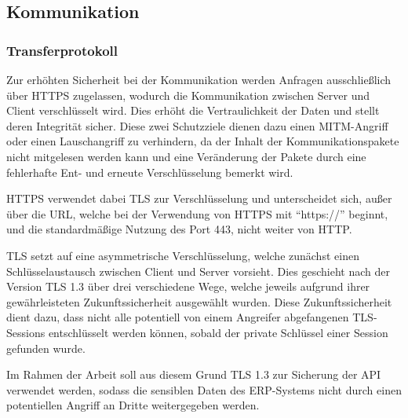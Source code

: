\subsection{Kommunikation}




\subsubsection{Transferprotokoll}\label{chapter:https}

Zur erhöhten Sicherheit bei der Kommunikation werden Anfragen ausschließlich über \ac{HTTPS} zugelassen, wodurch die Kommunikation zwischen Server und Client verschlüsselt wird.
Dies erhöht die Vertraulichkeit der Daten und stellt deren Integrität sicher.
Diese zwei Schutzziele dienen dazu einen \ac*{MITM}-Angriff oder einen Lauschangriff zu verhindern, da der Inhalt der Kommunikationspakete nicht mitgelesen werden kann und eine Veränderung der Pakete durch eine fehlerhafte Ent- und erneute Verschlüsselung bemerkt wird.

\ac{HTTPS} verwendet dabei \ac{TLS} zur Verschlüsselung und unterscheidet sich, außer über die \ac{URL}, welche bei der Verwendung von \ac{HTTPS} mit \enquote{https://} beginnt, und die standardmäßige Nutzung des Port 443, nicht weiter von \ac{HTTP}.

\ac{TLS} setzt auf eine asymmetrische Verschlüsselung, welche zunächst einen Schlüsselaustausch zwischen Client und Server vorsieht.
Dies geschieht nach der Version \ac{TLS} 1.3 über drei verschiedene Wege, welche jeweils aufgrund ihrer gewährleisteten Zukunftssicherheit ausgewählt wurden.
Diese Zukunftssicherheit dient dazu, dass nicht alle potentiell von einem Angreifer abgefangenen \ac{TLS}-Sessions entschlüsselt werden können, sobald der private Schlüssel einer Session gefunden wurde.

Im Rahmen der Arbeit soll aus diesem Grund \ac{TLS} 1.3 zur Sicherung der \ac{API} verwendet werden, sodass die sensiblen Daten des \ac{ERP}-Systems nicht durch einen potentiellen Angriff an Dritte weitergegeben werden.\autocite{rf-RFC8446}
